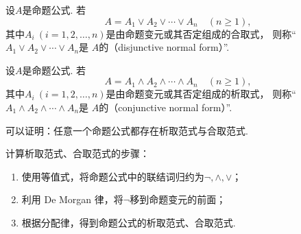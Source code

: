 \begin{definition}
设\(A\)是命题公式.
若\begin{equation*}
	A = A_1 \lor A_2 \lor \dotsb \lor A_n
	\quad(n\geq1),
\end{equation*}
其中\(A_i\ (i=1,2,\dotsc,n)\)是由命题变元或其否定组成的合取式，
则称“\(A_1 \lor A_2 \lor \dotsb \lor A_n\)是
\(A\)的（disjunctive normal form）”.
\end{definition}

\begin{definition}
设\(A\)是命题公式.
若\begin{equation*}
	A = A_1 \land A_2 \land \dotsb \land A_n
	\quad(n\geq1),
\end{equation*}
其中\(A_i\ (i=1,2,\dotsc,n)\)是由命题变元或其否定组成的析取式，
则称“\(A_1 \land A_2 \land \dotsb \land A_n\)是
\(A\)的（conjunctive normal form）”.
\end{definition}

可以证明：任意一个命题公式都存在析取范式与合取范式.

计算析取范式、合取范式的步骤：\begin{enumerate}
	\item 使用等值式，将命题公式中的联结词归约为\(\neg,\land,\lor\)；
	\item 利用 De Morgan 律，将\(\neg\)移到命题变元的前面；
	\item 根据分配律，得到命题公式的析取范式、合取范式.
\end{enumerate}

